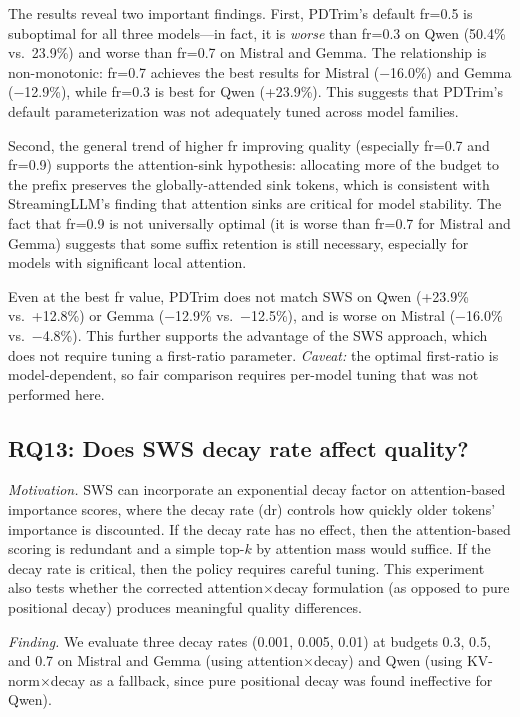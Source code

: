 \documentclass[11pt]{article}
\newcommand{\sws}{SWS}
\newcommand{\pct}{\%}
\theoremstyle{definition}
\theoremstyle{plain}
\begin{document}
The results reveal two important findings.  First, PDTrim's default fr=0.5 is suboptimal for all three models---in fact, it is \emph{worse} than fr=0.3 on Qwen (50.4\pct{} vs.\ 23.9\pct{}) and worse than fr=0.7 on Mistral and Gemma.  The relationship is non-monotonic: fr=0.7 achieves the best results for Mistral ($-$16.0\pct{}) and Gemma ($-$12.9\pct{}), while fr=0.3 is best for Qwen (+23.9\pct{}).  This suggests that PDTrim's default parameterization was not adequately tuned across model families.

Second, the general trend of higher fr improving quality (especially fr=0.7 and fr=0.9) supports the attention-sink hypothesis: allocating more of the budget to the prefix preserves the globally-attended sink tokens, which is consistent with StreamingLLM's finding that attention sinks are critical for model stability.  The fact that fr=0.9 is not universally optimal (it is worse than fr=0.7 for Mistral and Gemma) suggests that some suffix retention is still necessary, especially for models with significant local attention.

Even at the best fr value, PDTrim does not match \sws{} on Qwen (+23.9\pct{} vs.\ +12.8\pct{}) or Gemma ($-$12.9\pct{} vs.\ $-$12.5\pct{}), and is worse on Mistral ($-$16.0\pct{} vs.\ $-$4.8\pct{}).  This further supports the advantage of the \sws{} approach, which does not require tuning a first-ratio parameter.  \emph{Caveat:} the optimal first-ratio is model-dependent, so fair comparison requires per-model tuning that was not performed here.

\subsection{RQ13: Does SWS decay rate affect quality?}
\label{sec:rq13}

\emph{Motivation.}  \sws{} can incorporate an exponential decay factor on attention-based importance scores, where the decay rate (dr) controls how quickly older tokens' importance is discounted.  If the decay rate has no effect, then the attention-based scoring is redundant and a simple top-$k$ by attention mass would suffice.  If the decay rate is critical, then the policy requires careful tuning.  This experiment also tests whether the corrected attention$\times$decay formulation (as opposed to pure positional decay) produces meaningful quality differences.

\emph{Finding.}  We evaluate three decay rates (0.001, 0.005, 0.01) at budgets 0.3, 0.5, and 0.7 on Mistral and Gemma (using attention$\times$decay) and Qwen (using KV-norm$\times$decay as a fallback, since pure positional decay was found ineffective for Qwen).
\end{document}
